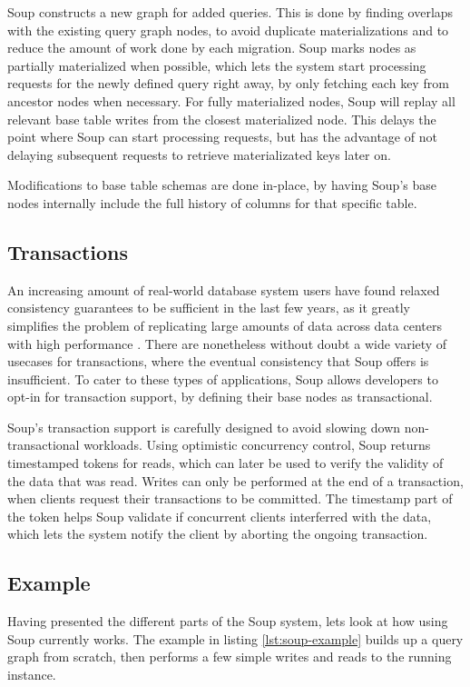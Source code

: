 \documentclass[b5paper]{report}
\begin{document}
Soup constructs a new graph for added queries. This is done by finding overlaps
with the existing query graph nodes, to avoid duplicate materializations and
to reduce the amount of work done by each migration. Soup marks nodes as
partially materialized when possible, which lets the system start processing
requests for the newly defined query right away, by only fetching each key from
ancestor nodes when necessary. For fully materialized nodes, Soup will replay
all relevant base table writes from the closest materialized node. This
delays the point where Soup can start processing requests, but has the advantage
of not delaying subsequent requests to retrieve materializated keys later on.

Modifications to base table schemas are done in-place, by having Soup's base
nodes internally include the full history of columns for that specific table.

\subsection{Transactions}
An increasing amount of real-world database system users have found relaxed
consistency guarantees to be sufficient in the last few years, as it greatly
simplifies the problem of replicating large amounts of data across data centers
with high performance \cite{existential}. There are nonetheless without doubt
a wide variety of usecases for transactions, where the eventual consistency that
Soup offers is insufficient. To cater to these types of applications, Soup
allows developers to opt-in for transaction support, by defining their base
nodes as transactional.

Soup's transaction support is carefully designed to avoid slowing down
non-transactional workloads. Using optimistic concurrency control, Soup returns
timestamped tokens for reads, which can later be used to verify the validity of
the data that was read. Writes can only be performed at the end of a
transaction, when clients request their transactions to be committed. The
timestamp part of the token helps Soup validate if concurrent clients
interferred with the data, which lets the system notify the client by aborting
the ongoing transaction.

\subsection{Example}
Having presented the different parts of the Soup system, lets look at how using
Soup currently works. The example in listing \ref{lst:soup-example} builds up a query
graph from scratch, then performs a few simple writes and reads to the running
instance.
\end{document}
